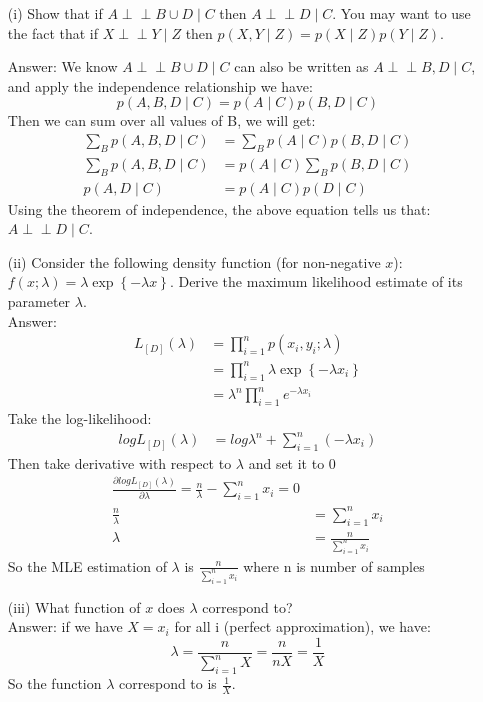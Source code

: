 \documentclass[11pt]{article}
\def\ci{\perp\!\!\!\perp}
\begin{document}
\begin{itemize}

\item[(i)] Show that if $A \ci B \cup D \mid C$ then $A \ci D \mid C$.  You may want to use the fact that if $X \ci Y \mid Z$ then $p(X, Y \mid Z) = p(X \mid Z) p(Y \mid Z)$.

Answer: We know $A \ci B \cup D \mid C$ can also be written as $A \ci B, D \mid C$, and apply the independence relationship we have:
$$p(A, B, D \mid C) = p(A \mid C) p(B, D \mid C)$$
Then we can sum over all values of B, we will get:
\begin{align*}
\sum_B p(A, B, D \mid C) &= \sum_B p(A \mid C) p(B, D \mid C)\\
\sum_B p(A, B, D \mid C) &= p(A \mid C) \sum_B p(B, D \mid C)\\
p(A, D \mid C) &= p(A \mid C)p(D \mid C)
\end{align*}
Using the theorem of independence, the above equation tells us that: $A \ci D \mid C$.
\item[(ii)] Consider the following density function (for non-negative $x$): $f(x; \lambda) = \lambda \exp \left\{ - \lambda x \right\}$.  Derive the maximum likelihood estimate of its parameter $\lambda$.\\
Answer: 
\begin{align*}
L_{[D]}(\lambda) &= \prod_{i=1}^n p(x_i,y_i;\lambda) \\
&= \prod_{i=1}^n \lambda \exp \left\{ - \lambda x_i \right\} \\
&= \lambda^n \prod_{i=1}^n e^{-\lambda x_i}
\end{align*}
Take the log-likelihood:
\begin{align*}
logL_{[D]}(\lambda) &= log\lambda^n + \sum_{i=1}^n(-\lambda x_i)
\end{align*}
Then take derivative with respect to $\lambda$ and set it to 0
\begin{align*}
\frac{\partial logL_{[D]}(\lambda)}{\partial \lambda} = \frac{n}{\lambda} - \sum_{i=1}^nx_i = 0\\
\frac{n}{\lambda} &= \sum_{i=1}^nx_i\\
\lambda&=\frac{n}{\sum_{i=1}^nx_i}
\end{align*}
So the MLE estimation of $\lambda$ is $\frac{n}{\sum_{i=1}^nx_i}$ where n is number of samples
\item[(iii)] What function of $x$ does $\lambda$ correspond to?\\
Answer: if we have $X = x_i$ for all i (perfect approximation), we have:
$$\lambda = \frac{n}{\sum_{i=1}^nX} = \frac{n}{nX}= \frac {1}{X}$$
So the function $\lambda$ correspond to is $\frac{1}{X}$.


\end{itemize}
\end{document}
